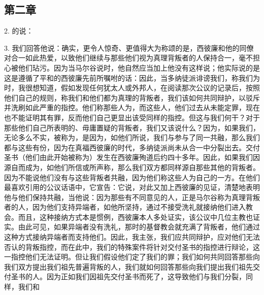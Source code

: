 
\subsection{第二章}

2. 的说：\par

3. 我们回答他说：确实，更令人惊奇、更值得大为称颂的是，西彼廉和他的同僚对合一如此热爱，以致他们继续与那些他们视为真理背叛者的人保持合一，毫不担心被他们玷污。因为当马尔谷说时，他自然应当加上他没有这样说；他实际说的是这是遵循了平和的西彼廉先前所嘱咐的话：因此，当多纳徒派诽谤我们，称我们为时，我很想知道，假如发现任何犹太人或外邦人，在阅读那次公议的记录后，按照他们自己的规则，称我们和他们都为真理的背叛者，我们该如何共同辩护，以驳斥并洗刷如此严重的指控。他们称那些人为，而这些人，他们过去从未能定罪，现在也不能证明其有罪，反而他们自己更显出该受同样的指控。但这与我们何干？对于那些他们自己所表明的、毋庸置疑的背叛者，我们又该说什么？因为，如果我们，无论多么不实，被称为，是因为，如他们所说，我们与参与了同一共融，那么我们都与这些有份，因为在真福西彼廉的时代，多纳徒派尚未从合一中分裂出去。交付圣书（他们由此开始被称为）发生在西彼廉殉道后约四十多年。因此，如果我们因源自而成为，如他们所信或所声称，那么我们双方都同样源自那些其他的背叛者。因为不能说他们没有与这些背叛者共融，因为他们称这些人为自己的一方。在他们最喜欢引用的公议话语中，它宣告：它说，对此又加上西彼廉的见证，清楚地表明他与他们保持共融，当他说：因为那些有不同意见的人，正是马尔谷称为真理背叛者的人，因为他们支持异端者，如他所坚持，通过不接受洗礼就接纳他们进入教会。而且，这种接纳方式本是惯例，西彼廉本人多处证实，该公议中几位主教也证实。由此可见，如果异端者没有洗礼，那时的基督教会就充满了背叛者，他们通过这种方式接纳异端者而支持他们。因此，我主张，我们应共同辩护，应对他们无法否认的背叛指控，而在此中，我们的特殊案件将针对交付圣书的指控进行辩论，这一指控他们无法证明。但让我们假设他们定了我们的罪；我们如何共同回答那些向我们双方提出我们祖先普遍背叛的人，我们就如何回答那些向我们提出我们祖先交付圣书的人。因为正如我们因祖先交付圣书而死了，这导致他们与我们分裂，同样，我们和